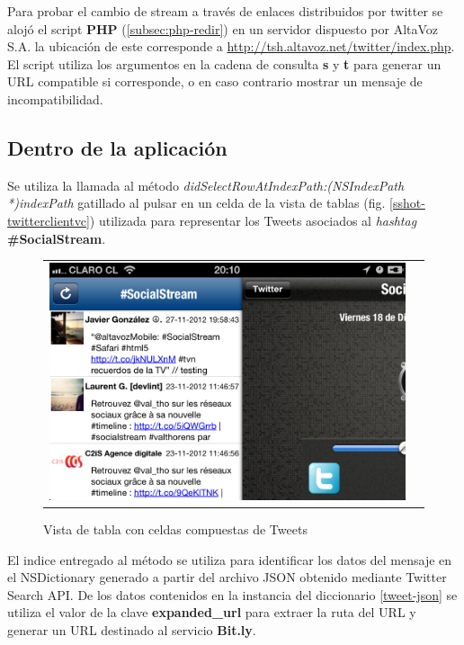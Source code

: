 Para probar el cambio de stream a través de enlaces distribuidos por twitter se alojó el script \textbf{PHP} (\ref{subsec:php-redir}) en un servidor dispuesto por AltaVoz S.A. la ubicación de este corresponde a \url{http://tsh.altavoz.net/twitter/index.php}.
El script utiliza los argumentos en la cadena de consulta \textbf{s} y \textbf{t} para generar un URL compatible si corresponde, o en caso contrario mostrar un mensaje de incompatibilidad.
  \subsection{Dentro de la aplicación}
Se utiliza la llamada al método \textit{didSelectRowAtIndexPath:(NSIndexPath *)indexPath} gatillado al pulsar en un celda de la vista de tablas (fig. \ref{sshot-twitterclientvc}) utilizada para representar los Tweets asociados al \textit{hashtag} \textbf{\#SocialStream}. \\

\begin{figure}[H]
	\centering
	\begin{tabular}{cc}
	\includegraphics[scale=0.3]{imgs/twclient-list.png}
	\end{tabular}
	\caption{Vista de tabla con celdas compuestas de Tweets}
	\label{fig:twclient-list}
\end{figure}

El indice entregado al método se utiliza para identificar los datos del mensaje en el NSDictionary generado a partir del archivo JSON obtenido mediante Twitter Search API. De los datos contenidos en la instancia del diccionario \ref{tweet-json} se utiliza el valor de la clave \textbf{expanded\_url} para extraer la ruta del URL y generar un URL destinado al servicio \textbf{Bit.ly}.  \\


